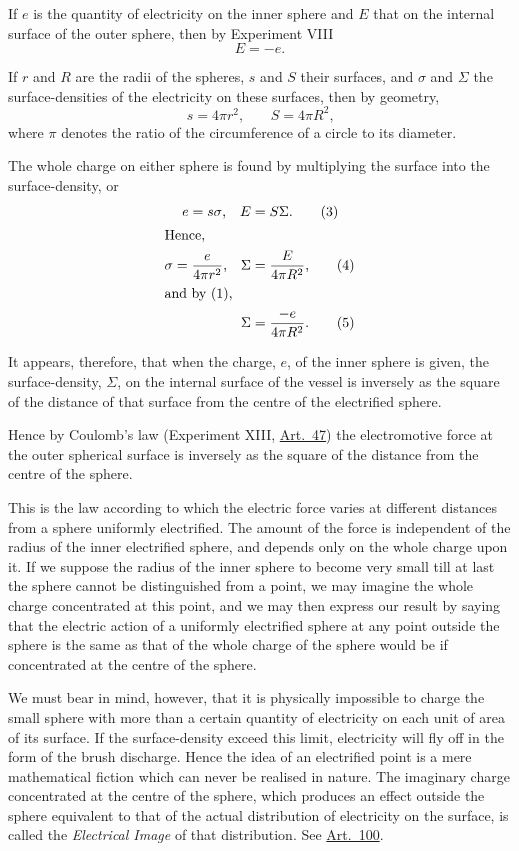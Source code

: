 \documentclass[12pt,oneside]{book}[2021/10/04]
\newcommand{\¬}{\hphantom{0}}
\begin{document}
If \(e\) is the quantity of electricity on the inner sphere and \(E\) that on
the internal surface of the outer sphere, then by Experiment VIII
\[
E = -e\text{.}\tag{1}
\]

If \(r\) and \(R\) are the radii of the spheres, \(s\) and \(S\) their surfaces,
and  \(\sigma\) and  \(\Sigma\) the surface-densities of the electricity on these
surfaces, then by geometry,
\[
s = 4 \pi r^2\text{,}\qquad S = 4 \pi R^2\text{,}\tag{2}
\]
where \(\pi\) denotes the ratio of the circumference of a circle to its
diameter.

The whole charge on either sphere is found by multiplying the
surface into the surface-density, or
\begin{align}
e = s \sigma\text{,} \quad E &= S \Sigma\text{.}\tag{3}\\
\shortintertext{Hence,}
\sigma = \frac{e}{4 \pi r^2}\text{,} \quad \Sigma &= \frac{E}{4 \pi R^2}\text{,}\tag{4}\\
\shortintertext{and by (1),}
\Sigma &= \frac{-e}{4 \pi R^2}\text{.}\tag{5}
\end{align}

It appears, therefore, that when the charge, \(e\), of the inner
sphere is given, the surface-density, \(\Sigma\), on the internal surface of
the vessel is inversely as the square of the distance of that surface
from the centre of the electrified sphere.

Hence by Coulomb's law (Experiment XIII, \hyperref[art:47]{Art.\ 47}) the electromotive
force at the outer spherical surface is inversely as the
square of the distance from the centre of the sphere.

This is the law according to which the electric force varies
at different distances from a sphere uniformly electrified. The
amount of the force is independent of the radius of the inner
electrified sphere, and depends only on the whole charge upon it.
If we suppose the radius of the inner sphere to become very small
till at last the sphere cannot be distinguished from a point, we
may imagine the whole charge concentrated at this point, and
we may then express our result by saying that the electric
action of a uniformly electrified sphere at any point outside the
sphere is the same as that of the whole charge of the sphere would
be if concentrated at the centre of the sphere.

We must bear in mind, however, that it is physically impossible
to charge the small sphere with more than a certain quantity of
electricity on each unit of area of its surface. If the surface-density
exceed this limit, electricity will fly off in the form of the
brush discharge. Hence the idea of an electrified point is a mere
mathematical fiction which can never be realised in nature. The
imaginary charge concentrated at the centre of the sphere, which
produces an effect outside the sphere equivalent to that of the
actual distribution of electricity on the surface, is called the
\textit{Electrical Image} of that distribution. See \hyperref[art:100]{Art.\ 100}.
\end{document}
